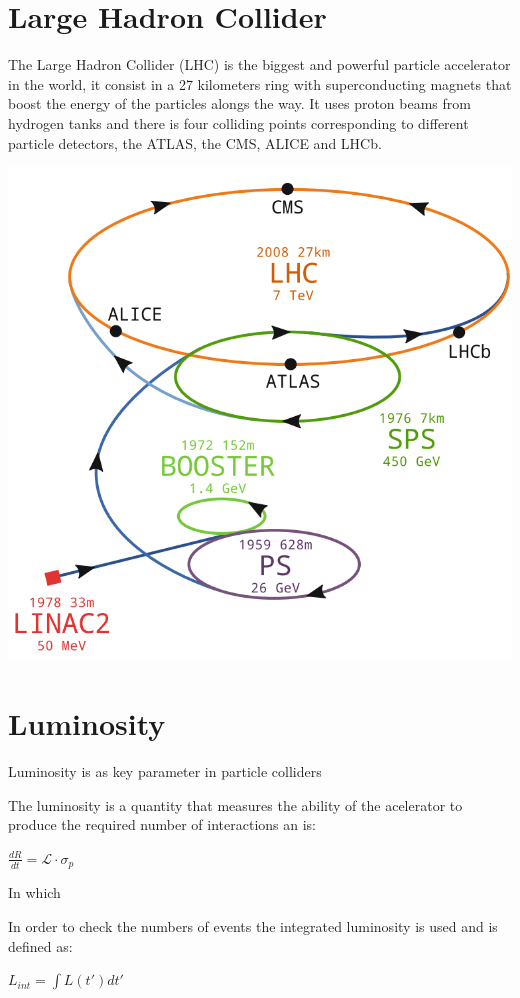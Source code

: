 \section{Large Hadron Collider}

The Large Hadron Collider (LHC) is the biggest and powerful particle accelerator in the world, it consist in a 27 kilometers ring with superconducting magnets that boost the energy of the particles alongs the way. It uses proton beams from hydrogen tanks and there is four colliding points corresponding to different particle detectors, the ATLAS, the CMS, ALICE and LHCb. \cite{LHC}

\includegraphics[scale=0.35]{LHC.png}



\section{Luminosity}
Luminosity is as key parameter in particle colliders

The luminosity is a quantity that measures the ability of the acelerator to produce the required number of interactions an is: 


$\frac{dR}{dt} = \mathcal{L} \cdot \sigma_{p} $ \cite{Lum} 


In which \cite{Lum}

In order to check the numbers of events the integrated luminosity is used and is defined as: 

$ L_{int} = \int L (t') dt' $



